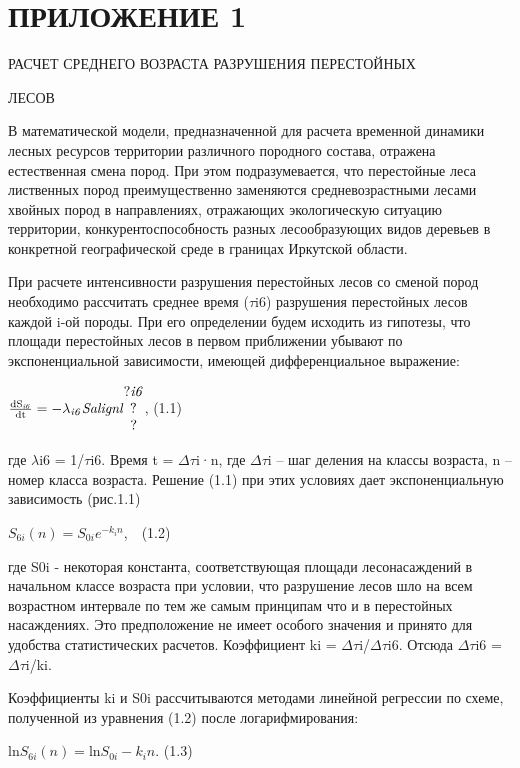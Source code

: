 \documentclass{report}
\newcommand\normalsubformula[1]{\text{\mathversion{normal}$#1$}}
\begin{document}
\section{ПРИЛОЖЕНИЕ 1}
РАСЧЕТ СРЕДНЕГО ВОЗРАСТА РАЗРУШЕНИЯ ПЕРЕСТОЙНЫХ 

ЛЕСОВ

В математической модели, предназначенной для расчета временной динамики лесных ресурсов территории различного породного
состава, отражена естественная смена пород. При этом подразумевается, что перестойные леса лиственных пород
преимущественно заменяются средневозрастными лесами хвойных пород в направлениях, отражающих экологическую ситуацию
территории, конкурентоспособность разных лесообразующих видов деревьев в конкретной географической среде в границах
Иркутской области.

При расчете интенсивности разрушения перестойных лесов со сменой пород необходимо рассчитать среднее время ($\tau $i6)
разрушения перестойных лесов каждой i{}-ой породы. При его определении будем исходить из гипотезы, что площади
перестойных лесов в первом приближении убывают по экспоненциальной зависимости, имеющей дифференциальное выражение: 

 $\frac{\normalsubformula{\text{dS}}_{\mathit{i6}}}{\normalsubformula{\text{dt}}}=-\lambda
_{\mathit{i6}}\mathit{Salignl}\begin{matrix}?\mathit{i6}\\?_{}\\?\end{matrix}$,  (1.1)

где $\lambda $i6 = 1/$\tau $i6. Время t = $\Delta $$\tau $i·n, где $\Delta $$\tau $i – шаг деления на классы возраста, n
– номер класса возраста. Решение (1.1) при этих условиях дает экспоненциальную зависимость (рис.1.1)

 $S_{6i}\left(n\right)=S_{0i}e^{-k_in}$,\ \   (1.2)

где S0i  {}- некоторая константа, соответствующая площади лесонасаждений в начальном классе возраста при условии, что
разрушение лесов шло на всем возрастном интервале по тем же самым принципам что и в перестойных насаждениях. Это
предположение не имеет особого значения и принято для удобства статистических расчетов. Коэффициент ki = $\Delta $$\tau
$i/$\Delta $$\tau $i6. Отсюда $\Delta $$\tau $i6 = $\Delta $$\tau $i/ki.

Коэффициенты ki и S0i рассчитываются методами линейной регрессии по схеме, полученной из уравнения (1.2) после
логарифмирования:

 $\text{ln}S_{6i}\left(n\right)=\text{ln}S_{0i}-k_in$.  (1.3)
\end{document}
